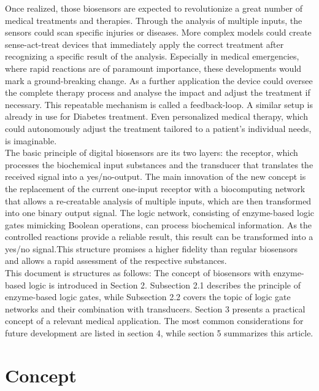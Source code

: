 \documentclass[runningheads]{llncs}
\begin{document}
	Once realized, those biosensors are expected to revolutionize a great number of medical treatments and therapies. Through the analysis of multiple inputs, the sensors could scan specific injuries or diseases. More complex models could create sense-act-treat devices that immediately apply the correct treatment after recognizing a specific result of the analysis. Especially in medical emergencies, where rapid reactions are of paramount importance, these developments would mark a ground-breaking change. As a further application the device could oversee the complete therapy process and analyse the impact and adjust the treatment if necessary. This repeatable mechanism is called a feedback-loop. A similar setup is already in use for Diabetes treatment. Even personalized medical therapy, which could autonomously adjust the treatment tailored to a patient’s individual needs, is imaginable. \cite{original}\\
	
	The basic principle of digital biosensors are its two layers: the receptor, which processes the biochemical input substances and the transducer that translates the received signal into a yes/no-output. \cite{state of the art} The main innovation of the new concept is the replacement of the current one-input receptor with a biocomputing network that allows a re-creatable analysis of multiple inputs, which are then transformed into one binary output signal. The logic network, consisting of enzyme-based logic gates mimicking Boolean operations, can process biochemical information.\cite{haupt} As the controlled reactions provide a reliable result, this result can be transformed into a yes/no signal.This structure promises a higher fidelity than regular biosensors and allows a rapid assessment of the respective substances.\\ 
	
	This document is structures as follows: The concept of biosensors with enzyme-based logic is introduced in Section 2. Subsection 2.1 describes the principle of enzyme-based logic gates, while Subsection 2.2 covers the topic of logic gate networks and their combination with transducers. Section 3 presents a practical concept of a relevant medical application. The most common considerations for future development are listed in section 4, while section 5 summarizes this article.
	
	
	
	
	
\section{Concept}
\end{document}
